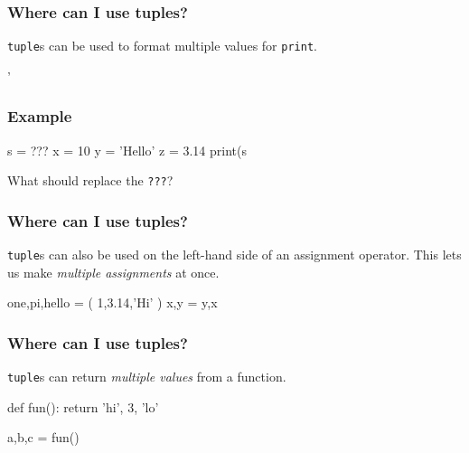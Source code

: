 \documentclass[11pt]{beamer}
\begin{document}
\begin{frame}[fragile]
  \frametitle{Where can I use tuples?}
  \Enlarge

  \begin{itemize}
  \myitem  \texttt{tuple}s can be used to format multiple values for \texttt{print}.
  \end{itemize}
  \begin{semiverbatim}
'%
  \end{semiverbatim}
\end{frame}

\begin{frame}[fragile]
  \frametitle{Example}
  \Enlarge

  \begin{semiverbatim}
s = ???
x = 10
y = 'Hello'
z = 3.14
print(s %
  \end{semiverbatim}
  What should replace the \texttt{???}?
\end{frame}

\begin{frame}[fragile]
  \frametitle{Where can I use tuples?}
  \Enlarge

  \begin{itemize}
  \myitem  \texttt{tuple}s can also be used on the left-hand side of an assignment operator.
  \myitem  This lets us make \emph{multiple assignments} at once.
  \end{itemize}
  \begin{semiverbatim}
one,pi,hello = ( 1,3.14,'Hi' )
x,y = y,x
  \end{semiverbatim}
\end{frame}

\begin{frame}[fragile]
  \frametitle{Where can I use tuples?}
  \Enlarge

  \begin{itemize}
  \myitem  \texttt{tuple}s can return \emph{multiple values} from a function.
  \end{itemize}
  \begin{semiverbatim}
def fun():
    return 'hi', 3, 'lo'

a,b,c = fun()
  \end{semiverbatim}
\end{frame}
\end{document}
